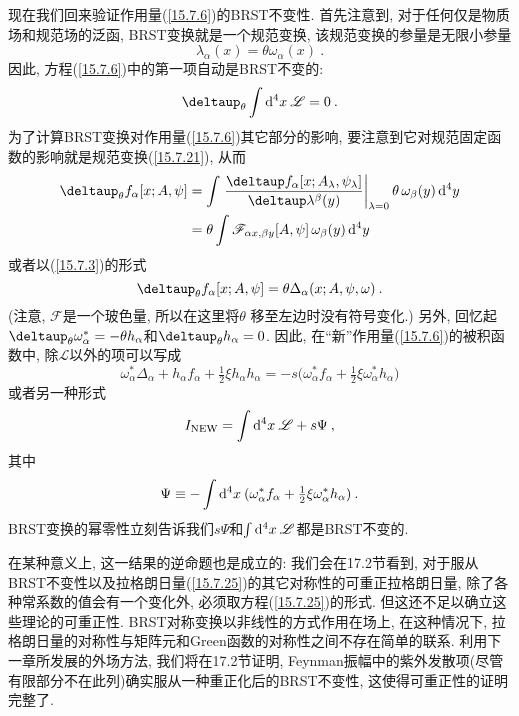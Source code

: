 现在我们回来验证作用量(\ref{15.7.6})的BRST不变性. 首先注意到, 对于任何仅是物质场和规范场的泛函, BRST变换就是一个规范变换, 该规范变换的参量是无限小参量
\begin{equation}
\lambda _{\alpha }(x)=\theta \omega _{\alpha }(x)\:.   \label{15.7.21}
\end{equation}%
因此, 方程(\ref{15.7.6})中的第一项自动是BRST不变的:%
\begin{equation}
\deltaup_{\theta }\int \dif^{4}x\:\mathscr{L}=0\:.   \label{15.7.22}
\end{equation}%
为了计算BRST变换对作用量(\ref{15.7.6})其它部分的影响, 要注意到它对规范固定函数的影响就是规范变换(\ref{15.7.21}), 从而
\begin{align*}
\deltaup_{\theta }f_{\alpha }[x;A,\psi ] &=\int \left. \frac{\deltaup
f_{\alpha }[x;A_{\lambda },\psi _{\lambda }]}{\deltaup \lambda ^{\beta }(y)}%
\right\vert _{\lambda =0}\theta \,\omega _{\beta }(y)\,\dif^{4}y \\
&=\theta \int \mathscr{F}_{\alpha x,\beta y}[A,\psi ]\,\omega _{\beta
}(y)\,\dif^{4}y
\end{align*}%
或者以(\ref{15.7.3})的形式%
\begin{equation}
\deltaup_{\theta }f_{\alpha }[x;A,\psi ]=\theta \Delta _{\alpha }(x;A,\psi
,\omega )\:.   \label{15.7.23}
\end{equation}%
(注意, $\mathscr{F}$是一个玻色量, 所以在这里将$\theta $%
移至左边时没有符号变化.) 另外, 回忆起$\deltaup
_{\theta }\omega _{\alpha }^{\ast }=-\theta h_{\alpha }$和$\deltaup_{\theta }h_{\alpha }=0$. 因此, 在``新''作用量(\ref{15.7.6})的被积函数中, 除$\mathscr{L}$以外的项可以写成%
\begin{equation}
\omega _{\alpha }^{\ast }\Delta _{\alpha }+h_{\alpha }f_{\alpha }+\tfrac{1}{2}%
\xi h_{\alpha }h_{\alpha }=-s\bigl( \omega _{\alpha }^{\ast }f_{\alpha }+%
\tfrac{1}{2}\xi \omega _{\alpha }^{\ast }h_{\alpha }\bigr)   \label{15.7.24}
\end{equation}%
或者另一种形式
\begin{equation}
I_{\mathrm{NEW}}=\int \mathrm{d}^{4}x\:\mathscr{L}+s\Psi \:,   \label{15.7.25}
\end{equation}%
其中
\begin{equation}
\Psi \equiv -\int \mathrm{d}^{4}x\:(\omega _{\alpha }^{\ast }f_{\alpha }+\tfrac{1}{2}\xi
\omega _{\alpha }^{\ast }h_{\alpha })\:.   \label{15.7.26}
\end{equation}%
BRST变换的幂零性立刻告诉我们$s\Psi $和$\int \mathrm{d}^{4}x\:\mathscr{L}$都是BRST不变的.

在某种意义上, 这一结果的逆命题也是成立的: 我们会在17.2节看到, 对于服从BRST不变性以及拉格朗日量(\ref{15.7.25})的其它对称性的可重正拉格朗日量, 除了各种常系数的值会有一个变化外, 必须取方程(\ref{15.7.25})的形式. 但这还不足以确立这些理论的可重正性. BRST对称变换以非线性的方式作用在场上, 在这种情况下,
拉格朗日量的对称性与矩阵元和Green函数的对称性之间不存在简单的联系. 利用下一章所发展的外场方法, 我们将在17.2节证明, Feynman振幅中的紫外发散项(尽管有限部分不在此列)确实服从一种重正化后的BRST不变性, 这使得可重正性的证明完整了.

